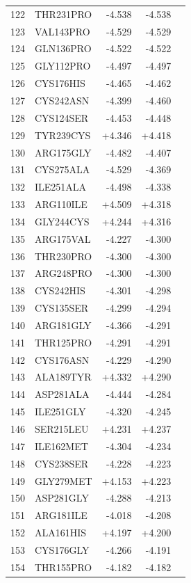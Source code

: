 \begin{longtable}{r l r r c}
122 & THR231PRO & -4.538 & -4.538 &  \\
123 & VAL143PRO & -4.529 & -4.529 &  \\
124 & GLN136PRO & -4.522 & -4.522 &  \\
125 & GLY112PRO & -4.497 & -4.497 &  \\
126 & CYS176HIS & -4.465 & -4.462 &  \\
127 & CYS242ASN & -4.399 & -4.460 &  \\
128 & CYS124SER & -4.453 & -4.448 &  \\
129 & TYR239CYS & +4.346 & +4.418 &  \\
130 & ARG175GLY & -4.482 & -4.407 &  \\
131 & CYS275ALA & -4.529 & -4.369 &  \\
132 & ILE251ALA & -4.498 & -4.338 &  \\
133 & ARG110ILE & +4.509 & +4.318 &  \\
134 & GLY244CYS & +4.244 & +4.316 &  \\
135 & ARG175VAL & -4.227 & -4.300 &  \\
136 & THR230PRO & -4.300 & -4.300 &  \\
137 & ARG248PRO & -4.300 & -4.300 &  \\
138 & CYS242HIS & -4.301 & -4.298 &  \\
139 & CYS135SER & -4.299 & -4.294 &  \\
140 & ARG181GLY & -4.366 & -4.291 &  \\
141 & THR125PRO & -4.291 & -4.291 &  \\
142 & CYS176ASN & -4.229 & -4.290 &  \\
143 & ALA189TYR & +4.332 & +4.290 &  \\
144 & ASP281ALA & -4.444 & -4.284 &  \\
145 & ILE251GLY & -4.320 & -4.245 &  \\
146 & SER215LEU & +4.231 & +4.237 &  \\
147 & ILE162MET & -4.304 & -4.234 &  \\
148 & CYS238SER & -4.228 & -4.223 &  \\
149 & GLY279MET & +4.153 & +4.223 &  \\
150 & ASP281GLY & -4.288 & -4.213 &  \\
151 & ARG181ILE & -4.018 & -4.208 &  \\
152 & ALA161HIS & +4.197 & +4.200 &  \\
153 & CYS176GLY & -4.266 & -4.191 &  \\
154 & THR155PRO & -4.182 & -4.182 &  \\

\end{longtable}
